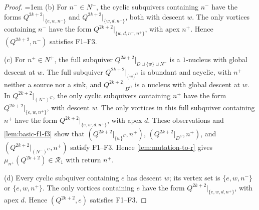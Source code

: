 \documentclass[10pt,a4paper]{amsart}
\theoremstyle{definition}
\theoremstyle{definition}
\numberwithin{equation}{section}
\numberwithin{table}{section}
\newcommand{\nminus}{N^{-}}
\newcommand{\nplus}{N^{+}}
\newcommand{\Rclass}{\mathcal{R}}
\newcommand{\Qalt}[1]{Q^{#1}}
\begin{document}
\begin{proof}
\begingroup\emergencystretch=1em
\textup{(b)} For $n^-\in\nminus$, the cyclic subquivers containing
$n^-$ have the forms $\Qalt{2k+2}|_{\{e,w,n^-\}}$ and
$\Qalt{2k+2}|_{\{w,d,n^-\}}$, both with descent $w$. The only vortices
containing $n^-$ have the
form $\Qalt{2k+2}|_{\{w,d,n^-,n^+\}}$, with apex $n^+$. Hence
$(\Qalt{2k+2},n^-)$ satisfies F1--F3.
\par\endgroup

\textup{(c)} For $n^+\in\nplus$, the full subquiver
$\Qalt{2k+2}|_{D\sqcup\{w\}\sqcup\nminus}$ is a $1$-nucleus with global
descent at $w$. The full subquiver $\Qalt{2k+2}|_{\{w\}^C}$ is abundant and
acyclic, with $n^+$ neither a source nor a sink, and
$\Qalt{2k+2}|_{D^C}$ is a nucleus with global descent at $w$. In
$\Qalt{2k+2}|_{(\nminus)^C}$, the only cyclic subquivers containing $n^+$
have the form $\Qalt{2k+2}|_{\{e,w,n^+\}}$, with descent $w$. The only
vortices in this full subquiver containing $n^+$ have the form
$\Qalt{2k+2}|_{\{e,w,d,n^+\}}$, with apex $d$. These observations and \cref{lem:basic-f1-f3} show that
$(\Qalt{2k+2}|_{\{w\}^C},n^+)$, $(\Qalt{2k+2}|_{D^C},n^+)$, and
$(\Qalt{2k+2}|_{(\nminus)^C},n^+)$ satisfy F1--F3. Hence
\cref{lem:mutation-to-r} gives
$\mu_{n^+}(\Qalt{2k+2})\in\Rclass_1$ with return $n^+$.

\textup{(d)} Every cyclic subquiver containing $e$ has descent $w$;
its vertex set is $\{e,w,n^-\}$ or $\{e,w,n^+\}$. The only
vortices containing $e$ have the form $\Qalt{2k+2}|_{\{e,w,d,n^+\}}$, with
apex $d$. Hence $(\Qalt{2k+2},e)$ satisfies F1--F3.
\end{proof}
\end{document}
